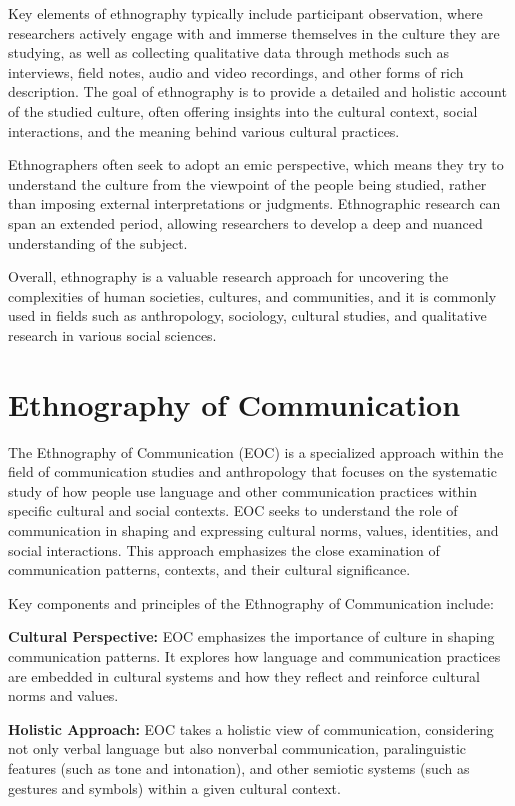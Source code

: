 \documentclass[
  b5paper]{book}
\begin{document}
Key elements of ethnography typically include participant observation, where researchers actively engage with and immerse themselves in the culture they are studying, as well as collecting qualitative data through methods such as interviews, field notes, audio and video recordings, and other forms of rich description. The goal of ethnography is to provide a detailed and holistic account of the studied culture, often offering insights into the cultural context, social interactions, and the meaning behind various cultural practices.

Ethnographers often seek to adopt an emic perspective, which means they try to understand the culture from the viewpoint of the people being studied, rather than imposing external interpretations or judgments. Ethnographic research can span an extended period, allowing researchers to develop a deep and nuanced understanding of the subject.

Overall, ethnography is a valuable research approach for uncovering the complexities of human societies, cultures, and communities, and it is commonly used in fields such as anthropology, sociology, cultural studies, and qualitative research in various social sciences.

\hypertarget{ethnography-of-communication}{%
\section{Ethnography of Communication}\label{ethnography-of-communication}}

The Ethnography of Communication (EOC) is a specialized approach within the field of communication studies and anthropology that focuses on the systematic study of how people use language and other communication practices within specific cultural and social contexts. EOC seeks to understand the role of communication in shaping and expressing cultural norms, values, identities, and social interactions. This approach emphasizes the close examination of communication patterns, contexts, and their cultural significance.

Key components and principles of the Ethnography of Communication include:

\textbf{Cultural Perspective:} EOC emphasizes the importance of culture in shaping communication patterns. It explores how language and communication practices are embedded in cultural systems and how they reflect and reinforce cultural norms and values.

\textbf{Holistic Approach:} EOC takes a holistic view of communication, considering not only verbal language but also nonverbal communication, paralinguistic features (such as tone and intonation), and other semiotic systems (such as gestures and symbols) within a given cultural context.
\end{document}
